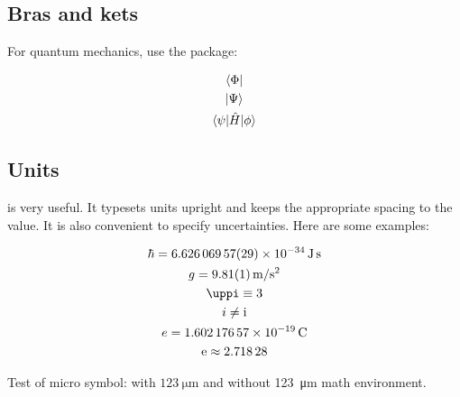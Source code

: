 \subsection{Bras and kets}
For quantum mechanics, use the  package:

\begin{gather}
	\bra{\Phi}\\
	\ket{\Psi}\\
	\braket{\psi|\hat{H}|\phi}
\end{gather}

\subsection{Units}
 is very useful. It typesets units upright and keeps the appropriate spacing to the value. It is also convenient to specify uncertainties. Here are some examples:

\begin{gather}
	\hbar = \SI[separate-uncertainty=false]{6.62606957(29)e-34}{\joule\second}\\
	g = \SI{9.81(1)}{\meter \per \s^2}\\
	\pi \equiv 3\\
	i \neq \i\\
	e = \SI{1.60217657e-19}{\coulomb}\\
	\e \approx \num{2.71828}\\
\end{gather}

Test of micro symbol: with $\SI{123}{\micro\meter}$ and without \SI{123}{\micro\meter} math environment.